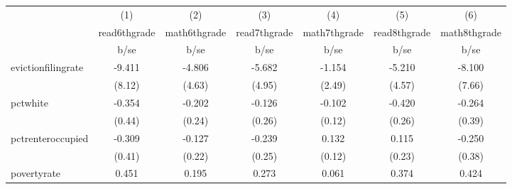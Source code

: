 {
\def\sym#1{\ifmmode^{#1}\else\(^{#1}\)\fi}
\begin{tabular}{l*{6}{c}}
\hline\hline
            &\multicolumn{1}{c}{(1)}           &\multicolumn{1}{c}{(2)}           &\multicolumn{1}{c}{(3)}           &\multicolumn{1}{c}{(4)}           &\multicolumn{1}{c}{(5)}           &\multicolumn{1}{c}{(6)}           \\
            &\multicolumn{1}{c}{read6thgrade}  &\multicolumn{1}{c}{math6thgrade}  &\multicolumn{1}{c}{read7thgrade}  &\multicolumn{1}{c}{math7thgrade}  &\multicolumn{1}{c}{read8thgrade}  &\multicolumn{1}{c}{math8thgrade}  \\
            &                     b/se         &                     b/se         &                     b/se         &                     b/se         &                     b/se         &                     b/se         \\
\hline
evictionfilingrate&                   -9.411         &                   -4.806         &                   -5.682         &                   -1.154         &                   -5.210         &                   -8.100         \\
            &                   (8.12)         &                   (4.63)         &                   (4.95)         &                   (2.49)         &                   (4.57)         &                   (7.66)         \\
pctwhite    &                   -0.354         &                   -0.202         &                   -0.126         &                   -0.102         &                   -0.420         &                   -0.264         \\
            &                   (0.44)         &                   (0.24)         &                   (0.26)         &                   (0.12)         &                   (0.26)         &                   (0.39)         \\
pctrenteroccupied&                   -0.309         &                   -0.127         &                   -0.239         &                    0.132         &                    0.115         &                   -0.250         \\
            &                   (0.41)         &                   (0.22)         &                   (0.25)         &                   (0.12)         &                   (0.23)         &                   (0.38)         \\
povertyrate &                    0.451         &                    0.195         &                    0.273         &                    0.061         &                    0.374         &                    0.424         \\

\end{tabular}}
